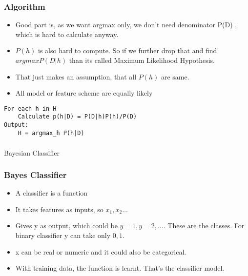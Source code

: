 \begin{frame}[fragile]\frametitle{Algorithm}



\begin{itemize}
\item Good part is, as we want argmax only, we don’t need denominator P(D) , which is hard to calculate anyway.
\item $P(h)$ is also hard to compute. So if we further drop that and find $argmax P(D|h)$ than its called Maximum Likelihood Hypothesis. 
\item That just makes an assumption, that all $P(h)$ are same. 
\item All model or feature scheme are equally likely
\end{itemize}

\begin{lstlisting}
For each h in H
    Calculate p(h|D) = P(D|h)P(h)/P(D)
Output:
    H = argmax_h P(h|D)

\end{lstlisting}

\end{frame}

\begin{frame}[fragile]\frametitle{}
\begin{center}
{\Large Bayesian Classifier}
\end{center}

\end{frame}


\begin{frame}[fragile]\frametitle{Bayes Classifier}
	\begin{itemize}
	\item A classifier is a function
	\item It takes features as inputs, so $x_1,x_2 \ldots$
	\item Gives y as output, which could be $y=1,y=2,\ldots$. These are the classes. For binary classifier y can take only $0,1$.
	\item x can be real or numeric and it could also be categorical.
	\item With training data, the function is learnt. That's the classifier model.
	\end{itemize}

\end{frame}


